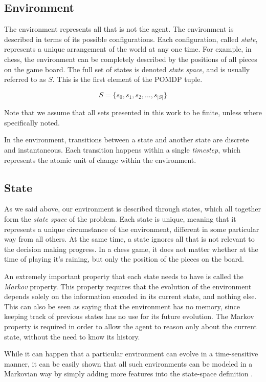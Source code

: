 \subsection{Environment}

The environment represents all that is not the agent. The environment is described in terms of its
possible configurations.  Each configuration, called \textit{state}, represents a unique
arrangement of the world at any one time. For example, in chess, the environment can be completely
described by the positions of all pieces on the game board. The full set of states is denoted
\textit{state space}, and is usually referred to as $S$. This is the first element of the POMDP
tuple.

\[ S = \{s_0, s_1, s_2, ..., s_{|S|}\} \]

Note that we assume that all sets presented in this work to be finite, unless where specifically
noted.

In the environment, transitions between a state and another state are discrete and instantaneous.
Each transition happens within a single \textit{timestep}, which represents the atomic unit of
change within the environment.

\subsection{State}

As we said above, our  environment is described through states, which all together form the
\textit{state space} of the problem. Each state is unique, meaning that it represents a unique
circumstance of the environment, different in some particular way from all others. At the same time,
a state ignores all that is not relevant to the decision making progress. In a chess game, it does
not matter whether at the time of playing it's raining, but only the position of the pieces on the
board.

An extremely important property that each state needs to have is called the \textit{Markov}
property. This property requires that the evolution of the environment depends solely on the
information encoded in its current state, and nothing else. This can also be seen as saying that the
environment has no memory, since keeping track of previous states has no use for its future
evolution. The Markov property is required in order to allow the agent to reason only about the
current state, without the need to know its history.

While it can happen that a particular environment can evolve in a time-sensitive manner, it can be
easily shown that all such environments can be modeled in a Markovian way by simply adding more
features into the state-space definition \cite{cit:boutilier}.


